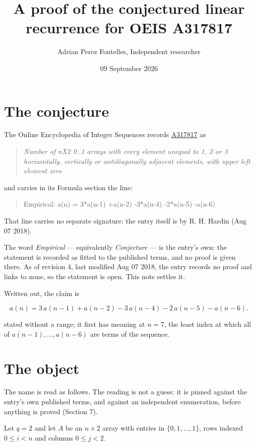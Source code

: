 \documentclass[11pt]{article}
\title{A proof of the conjectured linear recurrence for OEIS A317817}
\author{Adrian Perez Fontelles, Independent researcher}
\date{09 September 2026}
\theoremstyle{definition}
\begin{document}
\maketitle
\section{The conjecture}

The Online Encyclopedia of Integer Sequences records \href{https://oeis.org/A317817}{A317817} as

\begin{quote}\itshape Number of nX2 0..1 arrays with every element unequal to 1, 2 or 3 horizontally, vertically or antidiagonally adjacent elements, with upper left element zero\end{quote}

and carries in its Formula section the line:

\begin{quote}\ttfamily Empirical: a(n) = 3*a(n-1) +a(n-2) -3*a(n-4) -2*a(n-5) -a(n-6)\end{quote}

That line carries no separate signature; the entry itself is by R. H. Hardin (Aug 07 2018).

The word {\itshape Empirical} --- equivalently {\itshape Conjecture} --- is the entry's own: the statement is recorded as fitted to the published terms, and no proof is given there. As of revision 4, last modified Aug 07 2018, the entry records no proof and links to none, so the statement is open. This note settles it.

Written out, the claim is

\[a(n) = 3\,a(n-1) + a(n-2) - 3\,a(n-4) - 2\,a(n-5) - a(n-6).\]

stated without a range; it first has meaning at $n = 7$, the least index at which all of $a(n-1),\dots,a(n-6)$ are terms of the sequence.

\section{The object}

The name is read as follows. The reading is not a guess: it is pinned against the entry's own published terms, and against an independent enumeration, before anything is proved (Section 7).

Let $q = 2$ and let $A$ be an $n \times 2$ array with entries in $\{0,1,\dots,1\}$, rows indexed $0 \le i < n$ and columns $0 \le j < 2$.
\end{document}
